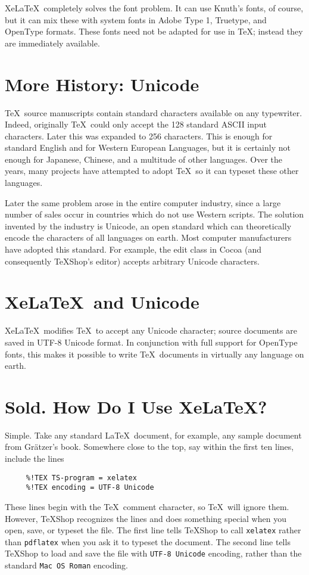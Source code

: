 \documentclass[11pt, oneside]{amsart}
\begin{document}
\begin{multicols}{2}
Xe\LaTeX\ completely solves the font problem. It can use Knuth's fonts, of course, but it can mix these with system fonts in Adobe Type 1, Truetype, and OpenType formats. These fonts need not be adapted for use in \TeX; instead they are immediately available.

\section{More History: Unicode}

\TeX\ source manuscripts contain standard characters available on any typewriter. Indeed, originally \TeX\ could only accept the 128 standard ASCII input characters. Later this was expanded to 256 characters. This is enough for standard English and for Western European Languages, but it is certainly not enough for Japanese, Chinese, and a multitude of other languages. Over the years, many projects have attempted to adopt \TeX\ so it can typeset these other languages.

Later the same problem arose in the entire computer industry, since a large number of sales occur in countries which do not use Western scripts. The solution invented by the industry is Unicode, an open standard which can theoretically encode the characters of all languages on earth. Most computer manufacturers have adopted this standard. For example, the edit class in Cocoa (and consequently TeXShop's editor) accepts arbitrary Unicode characters.

\section{Xe\LaTeX\ and Unicode}

Xe\LaTeX\ modifies \TeX\ to accept any Unicode character; source documents are saved in UTF-8 Unicode format. In conjunction with full support for OpenType fonts, this makes it possible to write \TeX\ documents in virtually any language on earth.

\section{Sold. How Do I Use Xe\LaTeX?}

Simple. Take any standard \LaTeX\ document, for example, any sample document from Gr\"atzer's book. Somewhere close to the top, say within the first ten lines, include the lines
\begin{verbatim}
     %!TEX TS-program = xelatex
     %!TEX encoding = UTF-8 Unicode
\end{verbatim}
These lines begin with the \TeX\ comment character, so \TeX\ will ignore them. However, TeXShop recognizes the lines and does something special when you open, save, or typeset the file. The first line tells TeXShop to call {\tt xelatex} rather than {\tt pdflatex} when you ask it to typeset the document. The second line tells TeXShop to load and save the file with {\tt UTF-8 Unicode} encoding, rather than the standard {\tt Mac OS Roman} encoding.


\end{multicols}
\end{document}
